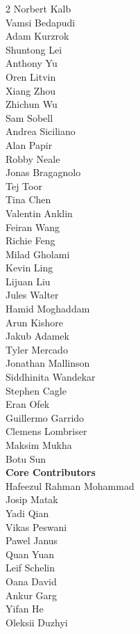 \begin{multicols}{2}
Norbert Kalb \\
Vamsi Bedapudi \\
Adam Kurzrok \\
Shuntong Lei \\
Anthony Yu \\
Oren Litvin \\
Xiang Zhou \\
Zhichun Wu \\
Sam Sobell \\
Andrea Siciliano \\
Alan Papir \\
Robby Neale \\
Jonas Bragagnolo \\
Tej Toor \\
Tina Chen \\
Valentin Anklin \\
Feiran Wang \\
Richie Feng \\
Milad Gholami \\
Kevin Ling \\
Lijuan Liu \\
Jules Walter \\
Hamid Moghaddam \\
Arun Kishore \\
Jakub Adamek \\
Tyler Mercado \\
Jonathan Mallinson \\
Siddhinita Wandekar \\
Stephen Cagle \\
Eran Ofek \\
Guillermo Garrido \\
Clemens Lombriser \\
Maksim Mukha \\
Botu Sun \\
\noindent
\textbf{Core Contributors} \\
Hafeezul Rahman Mohammad \\
Josip Matak \\
Yadi Qian \\
Vikas Peswani \\
Pawel Janus \\
Quan Yuan \\
Leif Schelin \\
Oana David \\
Ankur Garg \\
Yifan He \\
Oleksii Duzhyi \\

\end{multicols}
